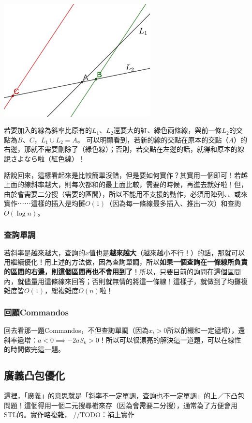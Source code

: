 \documentclass[main.tex]{subfiles}
\begin{document}
			\begin{center}
\includegraphics*[width = 0.6\textwidth]{images/bothdandiao_lines.png}
			\end{center}
			若要加入的線為斜率比原有的$L_1$、$L_2$還要大的紅、綠色兩條線，與前一條$L_2$的交點為$B$、$C$，$L_1 \cup L_2 = A$。 可以明顯看到，若新的線的交點在原本的交點（$A$）的右邊，那就不需要刪除了（綠色線）；否則，若交點在左邊的話，就得和原本的線說さよなら啦（紅色線）！
			
			話說回來，這樣看起來是比較簡單沒錯，但是要如何實作？其實用一個即可！若越上面的線斜率越大，則每次都和的最上面比較，需要的時候，再進去就好啦！但，由於會需要二分搜（需要的區間），所以不能用不支援的動作，必須用陣列、、或來實作⋯⋯這樣的插入是均攤$O(1)$（因為每一條線最多插入、推出一次）和查詢$O(\log n)$。
		\subsubsection{查詢單調}
			若斜率是越來越大，查詢的$x$值也是\textbf{越來越大}（越來越小不行！）的話，那就可以用繼續優化！用上述的方法做，因為查詢單調，所以\textbf{如果一個查詢在一條線所負責的區間的右邊，則這個區間再也不會用到了}！所以，只要目前的詢問在這個區間內，就儘量用這條線來回答；否則就無情的將這一條線！這樣子，就做到了均攤複雜度皆$O(1)$，總複雜度$O(n)$啦！
		\subsubsection{回顧Commandos}
			回去看那一題Commandos，不但查詢單調（因為$x_i > 0$所以前綴和一定遞增），還斜率遞增：$a < 0 \implies -2aS_{k} > 0$！所以可以很漂亮的解決這一道題，可以在線性的時間做完這一題。
	\subsection{廣義凸包優化}
		這裡，「廣義」的意思就是「斜率不一定單調，查詢也不一定單調」的上／下凸包問題！這個得用一個二元搜尋樹來存（因為會需要二分搜），通常為了方便會用STL的。實作略複雜，
		//TODO：補上實作
\end{document}
